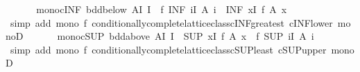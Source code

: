 \begin{isabellebody}
\endisatagproof
{\isafoldproof}%
%
\isadelimproof
\isanewline
%
\endisadelimproof
\ \ \isanewline
\ \ \isamarkupfalse%
\ mono{\isacharunderscore}{\kern0pt}cINF{\isacharcolon}{\kern0pt}\ {\isachardoublequoteopen}{\isasymlbrakk}bdd{\isacharunderscore}{\kern0pt}below\ {\isacharparenleft}{\kern0pt}A{\isacharbackquote}{\kern0pt}I{\isacharparenright}{\kern0pt}{\isacharsemicolon}{\kern0pt}\ I{\isasymnoteq}{\isacharbraceleft}{\kern0pt}{\isacharbraceright}{\kern0pt}{\isasymrbrakk}\ {\isasymLongrightarrow}\ f\ {\isacharparenleft}{\kern0pt}INF\ i{\isasymin}I{\isachardot}{\kern0pt}\ A\ i{\isacharparenright}{\kern0pt}\ {\isasymle}\ {\isacharparenleft}{\kern0pt}INF\ x{\isasymin}I{\isachardot}{\kern0pt}\ f\ {\isacharparenleft}{\kern0pt}A\ x{\isacharparenright}{\kern0pt}{\isacharparenright}{\kern0pt}{\isachardoublequoteclose}\isanewline
%
\isadelimproof
\ \ \ \ %
\endisadelimproof
%
\isatagproof
{}\isamarkupfalse%
\ {\isacharparenleft}{\kern0pt}simp\ add{\isacharcolon}{\kern0pt}\ {\isacartoucheopen}mono\ f{\isacartoucheclose}\ conditionally{\isacharunderscore}{\kern0pt}complete{\isacharunderscore}{\kern0pt}lattice{\isacharunderscore}{\kern0pt}class{\isachardot}{\kern0pt}cINF{\isacharunderscore}{\kern0pt}greatest\ cINF{\isacharunderscore}{\kern0pt}lower\ monoD{\isacharparenright}{\kern0pt}%
\endisatagproof
{\isafoldproof}%
%
\isadelimproof
\isanewline
%
\endisadelimproof
\ \ \isanewline
\ \ \isamarkupfalse%
\ mono{\isacharunderscore}{\kern0pt}cSUP{\isacharcolon}{\kern0pt}\ {\isachardoublequoteopen}{\isasymlbrakk}bdd{\isacharunderscore}{\kern0pt}above\ {\isacharparenleft}{\kern0pt}A{\isacharbackquote}{\kern0pt}I{\isacharparenright}{\kern0pt}{\isacharsemicolon}{\kern0pt}\ I{\isasymnoteq}{\isacharbraceleft}{\kern0pt}{\isacharbraceright}{\kern0pt}{\isasymrbrakk}\ {\isasymLongrightarrow}\ {\isacharparenleft}{\kern0pt}SUP\ x{\isasymin}I{\isachardot}{\kern0pt}\ f\ {\isacharparenleft}{\kern0pt}A\ x{\isacharparenright}{\kern0pt}{\isacharparenright}{\kern0pt}\ {\isasymle}\ f\ {\isacharparenleft}{\kern0pt}SUP\ i{\isasymin}I{\isachardot}{\kern0pt}\ A\ i{\isacharparenright}{\kern0pt}{\isachardoublequoteclose}\isanewline
%
\isadelimproof
\ \ \ \ %
\endisadelimproof
%
\isatagproof
{}\isamarkupfalse%
\ {\isacharparenleft}{\kern0pt}simp\ add{\isacharcolon}{\kern0pt}\ {\isacartoucheopen}mono\ f{\isacartoucheclose}\ conditionally{\isacharunderscore}{\kern0pt}complete{\isacharunderscore}{\kern0pt}lattice{\isacharunderscore}{\kern0pt}class{\isachardot}{\kern0pt}cSUP{\isacharunderscore}{\kern0pt}least\ cSUP{\isacharunderscore}{\kern0pt}upper\ monoD{\isacharparenright}{\kern0pt}%

\end{isabellebody}
